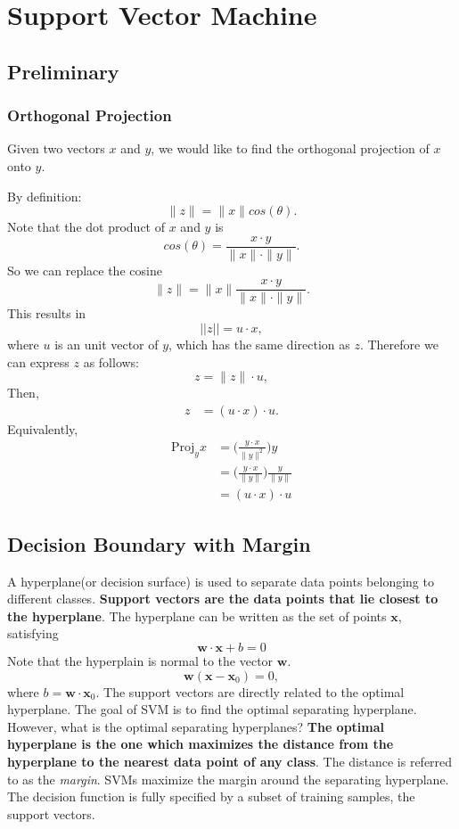 \chapter{Support Vector Machine}
\section{Preliminary}

\subsection{Orthogonal Projection}
Given two vectors $x$ and $y$, we would like to find the orthogonal projection of $x$ onto $y$.

By definition:
$$\|z\| = \|x\|cos(\theta).$$
Note that the dot product of $x$ and $y$ is 
$$cos(\theta)= \frac{x\cdot y}{\|x\|\cdot\|y\|}.$$
So we can replace the cosine 
$$\|z\| = \|x\|\frac{x\cdot y}{\|x\|\cdot\|y\|}.$$
This results in 
$$||z|| = u\cdot x,$$
where $u$ is an unit vector of $y$, which has the same direction as $z$. Therefore we can express $z$ as follows: 
$$z = \|z\|\cdot u,$$
Then, 
\begin{align*}
	z &= (u\cdot x)\cdot u.
\end{align*}
Equivalently, 
\begin{align*}
	\textrm{Proj}_yx &= \Bigg(\frac{y\cdot x}{\|y\|^2}\Bigg)y\\
					 &= \Bigg(\frac{y\cdot x}{\|y\|}\Bigg)\frac{y}{\|y\|}\\
					 &= (u\cdot x)\cdot u
\end{align*}

\section{Decision Boundary with Margin}
A hyperplane(or decision surface) is used to separate data points belonging to different classes. \textbf{Support vectors are the data points that lie closest to the hyperplane}. The hyperplane can be written as the set of points $\mathbf{x}$, satisfying 
$$\mathbf{w}\cdot \mathbf{x}+b=0$$
Note that the hyperplain is normal to the vector $\mathbf{w}$. 
$$\mathbf{w}(\mathbf{x}-\mathbf{x}_0)=0,$$
where $b = \mathbf{w}\cdot\mathbf{x}_0$. The support vectors are directly related to the optimal hyperplane. The goal of SVM is to find the optimal separating hyperplane. However, what is the optimal separating hyperplanes? \textbf{The optimal hyperplane is the one which maximizes the distance from the hyperplane to the nearest data point of any class}. The distance is referred to as the \textit{margin}. SVMs maximize the margin around the separating hyperplane. The decision function is fully specified by a subset of training samples, the support vectors. 

